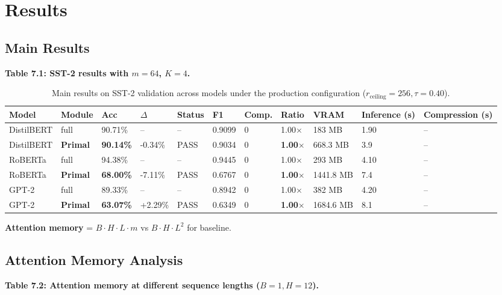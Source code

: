 
\section{Results}

\subsection{Main Results}

\textbf{Table 7.1: SST-2 results with $m = 64$, $K = 4$.}

\begin{table}[t]
\centering
\small
\begin{tabular}{lllllllllll}
\toprule
\textbf{Model} & \textbf{Module} & \textbf{Acc} & \textbf{$\Delta$} & \textbf{Status} & \textbf{F1} & \textbf{Comp.} & \textbf{Ratio} & \textbf{VRAM} & \textbf{Inference (s)} & \textbf{Compression (s)} \\
\midrule
DistilBERT & full & 90.71\% & -- & -- & 0.9099 & 0 & 1.00$\times$ & 183 MB & 1.90 & -- \\
DistilBERT & \textbf{Primal} & \textbf{90.14\%} & -0.34\% & PASS & 0.9034 & 0 & \textbf{1.00$\times$} & 668.3 MB & 3.9 & -- \\
RoBERTa & full & 94.38\% & -- & -- & 0.9445 & 0 & 1.00$\times$ & 293 MB & 4.10 & -- \\
RoBERTa & \textbf{Primal} & \textbf{68.00\%} & -7.11\% & PASS & 0.6767 & 0 & \textbf{1.00$\times$} & 1441.8 MB & 7.4 & -- \\
GPT-2 & full & 89.33\% & -- & -- & 0.8942 & 0 & 1.00$\times$ & 382 MB & 4.20 & -- \\
GPT-2 & \textbf{Primal} & \textbf{63.07\%} & +2.29\% & PASS & 0.6349 & 0 & \textbf{1.00$\times$} & 1684.6 MB & 8.1 & -- \\
\bottomrule
\end{tabular}
\caption{Main results on SST-2 validation across models under the production configuration ($r_{\mathrm{ceiling}}=256, \tau=0.40$).}
\label{tab:main_sst2}
\end{table}

\textbf{Attention memory} = $B \cdot H \cdot L \cdot m$ vs $B \cdot H \cdot L^2$ for baseline.

\subsection{Attention Memory Analysis}

\textbf{Table 7.2: Attention memory at different sequence lengths ($B=1, H=12$).}

